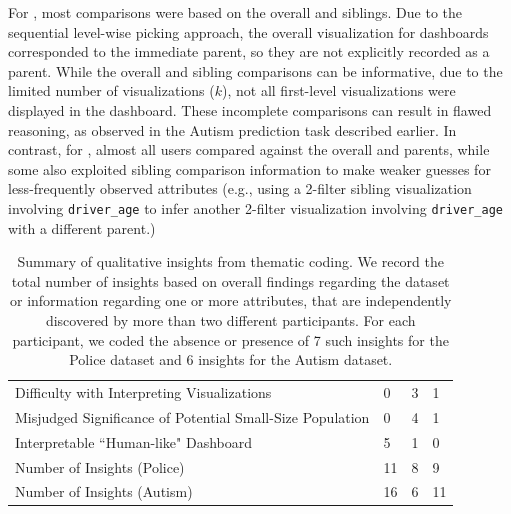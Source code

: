 \par For \BFS, most comparisons were based on the overall and siblings. Due to the sequential level-wise picking approach, the overall visualization for \BFS dashboards corresponded to the immediate parent, so they are not explicitly recorded as a parent. While the overall and sibling comparisons can be informative, due to the limited number of visualizations ($k$), not all first-level visualizations were displayed in the dashboard. These incomplete comparisons can result in flawed reasoning, as observed in the Autism prediction task described earlier. In contrast, for \system, almost all users compared against the overall and parents, while some also exploited sibling comparison information to make weaker guesses for less-frequently observed attributes (e.g., using a 2-filter sibling visualization involving \texttt{driver\_age} to infer another 2-filter visualization involving \texttt{driver\_age} with a different parent.)
\begin{table}[ht!]
	\centering
	\begin{tabular}{|l|l|l|l|}
	\hline & \system & \cluster & \BFS \\ \hline
	Difficulty with Interpreting Visualizations & 0 & \cellcolor[HTML]{FD6864}3 & 1 \\ \hline
	Misjudged Significance of Potential Small-Size Population & 0 & \cellcolor[HTML]{FD6864}4 & 1 \\ \hline
	Interpretable ``Human-like" Dashboard & \cellcolor[HTML]{9AFF99}5 & 1 & 0 \\ \hline
	Number of Insights (Police) & \cellcolor[HTML]{9AFF99}11 & 8 & 9 \\ \hline
	Number of Insights (Autism) & \cellcolor[HTML]{9AFF99}16 & 6 & 11 \\\hline
	\end{tabular}
\caption{Summary of qualitative insights from thematic coding. We record the total number of insights based on overall findings regarding the dataset or information regarding one or more attributes, that are independently discovered by more than two different participants. For each participant, we coded the absence or presence of 7 such insights for the Police dataset and 6 insights for the Autism dataset.}
\label{table:thematic_summary}
\vspace{-15pt}
\end{table}
